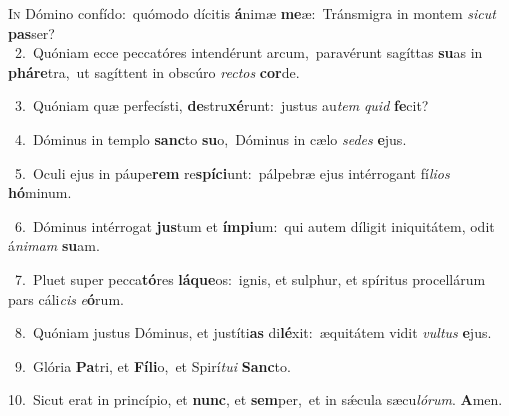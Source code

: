 \lettrine{\initial\textcolor{\initialcolor}{I}}{n} Dómino confído:~\dagger quómodo dícitis \textbf{á}\-nimæ \textbf{me}\-æ:~\star Tránsmigra in montem \textit{sic}\-\textit{ut} \textbf{pas}\-ser?\\
{\numbfont\textcolor{\numbcolor}{~2.}}~Quóniam ecce peccatóres intendérunt arcum,~\dagger paravérunt sagíttas \textbf{su}\-as in \textbf{phá}\-\textbf{re}tra,~\star ut sagíttent in obscúro \textit{rec}\-\textit{tos} \textbf{cor}\-de.\par
{\numbfont\textcolor{\numbcolor}{~3.}}~Quóniam quæ perfecísti, \textbf{de}\-stru\-\textbf{xé}\-runt:~\star justus au\textit{tem} \textit{quid} \textbf{fe}\-cit?\par
{\numbfont\textcolor{\numbcolor}{~4.}}~Dóminus in templo \textbf{sanc}\-to \textbf{su}\-o,~\star Dóminus in cælo \textit{se}\-\textit{des} \textbf{e}\-jus.\par
{\numbfont\textcolor{\numbcolor}{~5.}}~Oculi ejus in páupe\textbf{rem} re\-\textbf{spí}\-\textbf{ci}unt:~\star pálpebræ ejus intérrogant fí\-\textit{li}\-\textit{os} \textbf{hó}\-minum.\par
{\numbfont\textcolor{\numbcolor}{~6.}}~Dóminus intérrogat \textbf{jus}\-tum et \textbf{ím}\-\textbf{pi}um:~\star qui autem díligit iniquitátem, odit á\-\textit{ni}\-\textit{mam} \textbf{su}\-am.\par
{\numbfont\textcolor{\numbcolor}{~7.}}~Pluet super pecca\-\textbf{tó}\-res \textbf{lá}\-\textbf{que}os:~\star ignis, et sulphur, et spíritus procellárum pars cáli\textit{cis} \textit{e}\-\textbf{ó}rum.\par
{\numbfont\textcolor{\numbcolor}{~8.}}~Quóniam justus Dóminus, et justíti\textbf{as} di\-\textbf{lé}\-xit:~\star æquitátem vidit \textit{vul}\-\textit{tus} \textbf{e}\-jus.\par
{\numbfont\textcolor{\numbcolor}{~9.}}~Glória \textbf{Pa}\-tri, et \textbf{Fí}\-\textbf{li}o,~\star et Spirí\-\textit{tu}\-\textit{i} \textbf{Sanc}\-to.\par
{\numbfont\textcolor{\numbcolor}{10.}}~Sicut erat in princípio, et \textbf{nunc}\-, et \textbf{sem}\-per,~\star et in sǽcula sæcu\-\textit{ló}\-\textit{rum}. \textbf{A}\-men.\par
